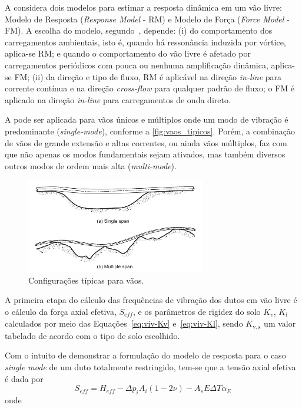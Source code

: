 A  considera dois modelos para estimar a resposta dinâmica em um vão livre: Modelo de Resposta (\textit{Response Model} - RM) e Modelo de Força (\textit{Force Model} - FM).
A escolha do modelo, segundo~, depende: (i) do comportamento dos carregamentos ambientais, isto é, quando há ressonância induzida por vórtice, aplica-se RM; e quando o comportamento do vão livre é afetado por carregamentos periódicos com pouca ou nenhuma amplificação dinâmica, aplica-se FM; (ii) da direção e tipo de fluxo, RM é aplicável na direção \textit{in-line} para corrente contínua e na direção \textit{cross-flow} para qualquer padrão de fluxo; o FM é aplicado na direção \textit{in-line} para carregamentos de onda direto.

A  pode ser aplicada para vãos únicos e múltiplos onde um modo de vibração é predominante (\textit{single-mode}), conforme a \autoref{fig:vaos_tipicos}.
Porém, a combinação de vãos de grande extensão e altas correntes, ou ainda vãos múltiplos, faz com que não apenas os modos fundamentais sejam ativados, mas também diversos outros modos de ordem mais alta (\textit{multi-mode}).

\begin{figure}[!ht]
	\centering
    \caption{Configurações típicas para vãos.}\label{fig:vaos_tipicos}
	\includegraphics[width=0.7\textwidth]{imagens/vaos_tipicos}
\end{figure}

A primeira etapa do cálculo das frequências de vibração dos dutos em vão livre é o cálculo da força axial efetiva, $S_\mathit{eff}$, e os parâmetros de rigidez do solo $K_v$, $K_l$ calculados por meio das Equações~\ref{eq:viv-Kv} e~\ref{eq:viv-Kl}, sendo $K_\mathrm{v,s}$ um valor tabelado de acordo com o tipo de solo escolhido.

Com o intuito de demonstrar a formulação do modelo de resposta para o caso \textit{single mode} de um duto totalmente restringido, tem-se que a tensão axial efetiva é dada por
\begin{equation}
\label{eq:viv-Seff}
S_\mathit{eff} = H_\mathit{eff} - \Delta p_i A_i (1 - 2\nu) - A_s E \Delta T \alpha_E
\end{equation}
onde

